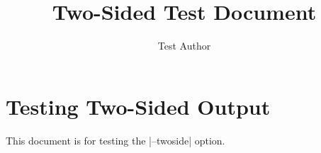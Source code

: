 \documentclass[twoside]{memoir}
\title{\sffamily Two-Sided Test Document}
\author{\sffamily Test Author}
\date{\sffamily }
\begin{document}
\frontmatter

\begin{titlingpage}
\maketitle
\end{titlingpage}

\tableofcontents



\mainmatter
\chapter{Testing Two-Sided Output}\label{Two--Sided--Test--Document----Testing--Two--Sided--Output}

This document is for testing the \LeanVerb|--twoside| option.
\end{document}
